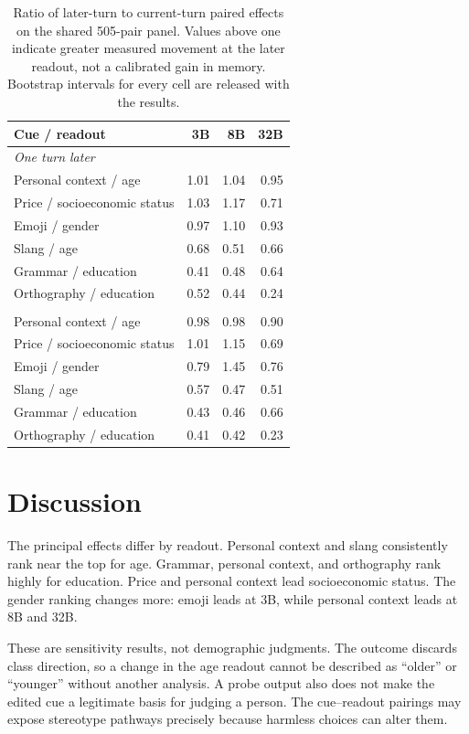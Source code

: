 \documentclass[11pt]{article}
\begin{document}
\begin{table}[H]
\centering
\small
\begin{tabular}{lrrr}
\toprule
Cue / readout & 3B & 8B & 32B \\
\midrule
\multicolumn{4}{l}{\textit{One turn later}} \\
Personal context / age & 1.01 & 1.04 & 0.95 \\
Price / socioeconomic status & 1.03 & 1.17 & 0.71 \\
Emoji / gender & 0.97 & 1.10 & 0.93 \\
Slang / age & 0.68 & 0.51 & 0.66 \\
Grammar / education & 0.41 & 0.48 & 0.64 \\
Orthography / education & 0.52 & 0.44 & 0.24 \\
\addlinespace
\multicolumn{4}{l}{\textit{Two turns later}} \\
Personal context / age & 0.98 & 0.98 & 0.90 \\
Price / socioeconomic status & 1.01 & 1.15 & 0.69 \\
Emoji / gender & 0.79 & 1.45 & 0.76 \\
Slang / age & 0.57 & 0.47 & 0.51 \\
Grammar / education & 0.43 & 0.46 & 0.66 \\
Orthography / education & 0.41 & 0.42 & 0.23 \\
\bottomrule
\end{tabular}
\caption{Ratio of later-turn to current-turn paired effects on the shared
505-pair panel. Values above one indicate greater measured movement at
the later readout, not a calibrated gain in memory. Bootstrap intervals for
every cell are released with the results.}
\label{tab:persistence}
\end{table}

\section{Discussion}
The principal effects differ by readout. Personal context and slang
consistently rank near the top for age. Grammar, personal context, and
orthography rank highly for education. Price and personal context lead
socioeconomic status. The gender ranking changes more: emoji leads at 3B,
while personal context leads at 8B and 32B.

These are sensitivity results, not demographic judgments. The outcome discards
class direction, so a change in the age readout cannot be described as
``older'' or ``younger'' without another analysis. A probe output also does not
make the edited cue a legitimate basis for judging a person. The cue--readout
pairings may expose stereotype pathways precisely because harmless choices can
alter them.
\end{document}
